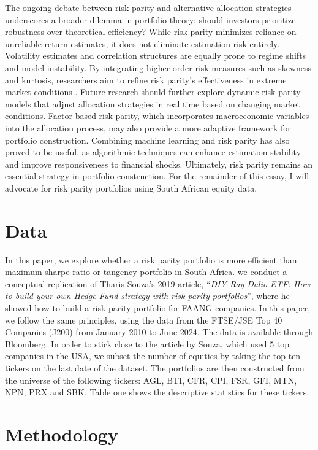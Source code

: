 \documentclass[preprint, 3p,
authoryear]{elsarticle} %
\begin{document}
The ongoing debate between risk parity and alternative allocation
strategies underscores a broader dilemma in portfolio theory: should
investors prioritize robustness over theoretical efficiency? While risk
parity minimizes reliance on unreliable return estimates, it does not
eliminate estimation risk entirely. Volatility estimates and correlation
structures are equally prone to regime shifts and model instability. By
integrating higher order risk measures such as skewness and kurtosis,
researchers aim to refine risk parity's effectiveness in extreme market
conditions \citep{braga2023}. Future research should further explore
dynamic risk parity models that adjust allocation strategies in real
time based on changing market conditions. Factor-based risk parity,
which incorporates macroeconomic variables into the allocation process,
may also provide a more adaptive framework for portfolio construction.
Combining machine learning and risk parity has also proved to be useful,
as algorithmic techniques can enhance estimation stability and improve
responsiveness to financial shocks. Ultimately, risk parity remains an
essential strategy in portfolio construction. For the remainder of this
essay, I will advocate for risk parity portfolios using South African
equity data.

\hypertarget{data}{%
\section{Data}\label{data}}

In this paper, we explore whether a risk parity portfolio is more
efficient than maximum sharpe ratio or tangency portfolio in South
Africa. we conduct a conceptual replication of Tharis Souza's 2019
article,
``\textit{DIY Ray Dalio ETF: How to build your own Hedge Fund strategy with risk parity portfolios}'',
where he showed how to build a risk parity portfolio for FAANG
companies. In this paper, we follow the same principles, using the data
from the FTSE/JSE Top 40 Companies (J200) from January 2010 to June
2024. The data is available through Bloomberg. In order to stick close
to the article by Souza, which used 5 top companies in the USA, we
subset the number of equities by taking the top ten tickers on the last
date of the dataset. The portfolios are then constructed from the
universe of the following tickers: AGL, BTI, CFR, CPI, FSR, GFI, MTN,
NPN, PRX and SBK. Table one shows the descriptive statistics for these
tickers.

\hypertarget{methodology}{%
\section{Methodology}\label{methodology}}
\end{document}
